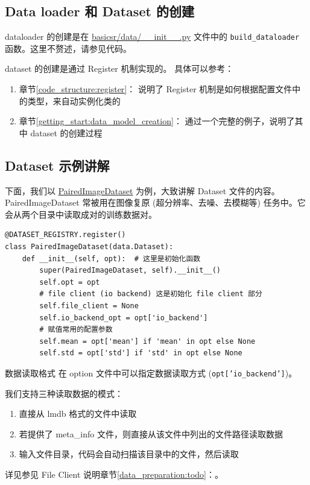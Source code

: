 \documentclass[../main.tex]{subfiles}
\begin{document}
\subsection{Data loader 和 Dataset 的创建}\label{code_structure:dataloader_dataset}

dataloader 的创建是在 \href{https://github.com/XPixelGroup/BasicSR/blob/master/basicsr/data/\_\_init\_\_.py}{basicsr/data/\_\_init\_\_.py} 文件中的 \texttt{build\_dataloader} 函数。这里不赘述，请参见代码。

dataset 的创建是通过 Register 机制实现的。
具体可以参考：
\begin{enumerate}
    \item 章节\ref{code_structure:register}： 说明了 Register 机制是如何根据配置文件中的类型，来自动实例化类的
    \item 章节\ref{getting_start:data_model_creation}： 通过一个完整的例子，说明了其中 dataset 的创建过程
\end{enumerate}

\subsection{Dataset 示例讲解}\label{code_structure:dataset_example}

下面，我们以 \href{https://github.com/XPixelGroup/BasicSR/blob/master/basicsr/data/paired\_image\_dataset.py}{PairedImageDataset} 为例，大致讲解 Dataset 文件的内容。
PairedImageDataset 常被用在图像复原 (超分辨率、去噪、去模糊等) 任务中。它会从两个目录中读取成对的训练数据对。

\begin{verbatim}
@DATASET_REGISTRY.register()
class PairedImageDataset(data.Dataset):
    def __init__(self, opt):  # 这里是初始化函数
        super(PairedImageDataset, self).__init__()
        self.opt = opt
        # file client (io backend) 这是初始化 file client 部分
        self.file_client = None
        self.io_backend_opt = opt['io_backend']
        # 赋值常用的配置参数
        self.mean = opt['mean'] if 'mean' in opt else None
        self.std = opt['std'] if 'std' in opt else None
\end{verbatim}
\begin{exampleBox}[righthand ratio=0.00, sidebyside, sidebyside align=center, lower separated=false]{数据读取格式}
在 option 文件中可以指定数据读取方式 (\texttt{opt['io\_backend']})。

我们支持三种读取数据的模式：
\begin{enumerate}
    \item 直接从 lmdb 格式的文件中读取
    \item 若提供了 meta\_info 文件，则直接从该文件中列出的文件路径读取数据
    \item 输入文件目录，代码会自动扫描该目录中的文件，然后读取
\end{enumerate}
详见参见 File Client 说明章节\ref{data_preparation:todo}：。 
\end{exampleBox}
\end{document}
